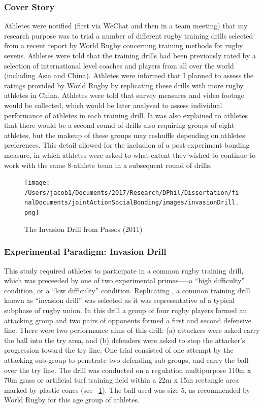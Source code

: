 \documentclass[english]{article}\usepackage[]{graphicx}\usepackage[]{color}
\begin{document}
\subsubsection{Cover Story}

Athletes were notified (first via WeChat and then in a team meeting) that my research purpose was to trial a number of different rugby training drills selected from a recent report by World Rugby concerning training methods for rugby sevens.  Athletes were told that the training drills had been previously rated by a selection of international level coaches and players from all over the world (including Asia and China).  Athletes were informed that I planned to assess the ratings provided by World Rugby by replicating these drills with more rugby athletes in China.  Athletes were told that survey measures and video footage would be collected, which would be later analysed to assess individual performance of athletes in each training drill.  It was also explained to athletes that there would be a second round of drills also requiring groups of eight athletes, but the makeup of these groups may reshuffle depending on athletes preferences.  This detail allowed for the includion of a post-experiment bonding measure, in which athletes were asked to what extent they wished to continue to work with the same 8-athlete team in a subsequent round of drills.


\begin{figure}[htbp]
  \texttt{[image: /Users/jacob1/Documents/2017/Research/DPhil/Dissertation/finalDocuments/jointActionSocialBonding/images/invasionDrill.png]}
  \caption{The Invasion Drill from Passos (2011)}
  \label{fig:invasionDrill}
\end{figure}

\subsubsection{Experimental Paradigm: Invasion Drill}
This study required athletes to participate in a common rugby training drill, which was preceeded by one of two experimental primes—--a ``high difficulty'' condition, or a ``low difficulty'' condition.   Replicating \textcite{Passos2011}, a common training drill known as ``invasion drill'' \citep{Biscombe1998} was selected as it was representative of a typical subphase of rugby union.  In this drill a group of four rugby players formed an attacking group and two pairs of opponents formed a first and second defensive line.  There were two performance aims of this drill: (a) attackers were asked carry the ball into the try area, and (b) defenders were asked to stop the attacker’s progression toward the try line.  One trial consisted of one attempt by the attacking sub-group to penetrate two defending sub-groups, and carry the ball over the try line. The drill was conducted on a regulation multipurpose 110m x 70m grass or artificial turf training field within a 22m x 15m rectangle area marked by plastic cones (see ~\ref{fig:invasionDrill}). The ball used was size 5, as recommended by World Rugby for this age group of athletes.
\end{document}
